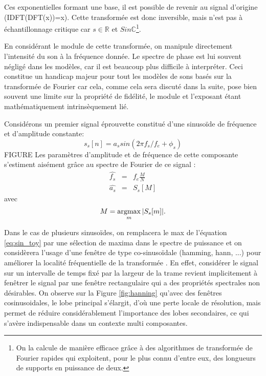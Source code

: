 Ces exponentielles formant une base, il est possible de revenir au signal d'origine (IDFT(DFT(x))=x). Cette transformée est donc inversible, mais n'est pas à échantillonnage critique car $s\in \mathbb{R}$  et $S in \mathbb{C}$\footnote{On la calcule de manière efficace grâce à des algorithmes de transformée de Fourier rapides qui exploitent, pour le plus connu d'entre eux, des longueurs de supports en puissance de deux.}.

En considérant le module de cette transformée, on manipule directement l'intensité du son à la fréquence donnée. Le spectre de phase est lui souvent négligé dans les modèles, car il est beaucoup plus difficile à interpréter. Ceci constitue un handicap majeur pour tout les modèles de sons basés sur la transformée de Fourier car cela, comme cela sera discuté dans la suite, pose bien souvent une limite sur la propriété de fidélité, le module et l'exposant étant mathématiquement intrinsèquement lié.

Considérons un premier signal \og éprouvette \fg constitué d'une sinusoïde de fréquence et d'amplitude constante:
\begin{equation}
  s_s[n] = a_s sin(2\pi f_s/f_e + \phi_s)
  \label{eq:sin_toy}
\end{equation} FIGURE
Les paramètres d'amplitude et de fréquence de cette composante s'estiment aisément grâce au spectre de Fourier de ce signal :
\begin{eqnarray}
  \hat{f_s} &=& f_e \frac{M}{N} \\
  \hat{a_s} &=& S_s[M]
\end{eqnarray}
avec
\begin{equation}
  M = \operatorname*{argmax}_m | S_s[m] |.
\end{equation}

Dans le cas de plusieurs sinusoïdes, on remplacera le max de l'équation \ref{eq:sin_toy} par une sélection de maxima dans le spectre de puissance et on considèrera l'usage d'une fenêtre de type co-sinusoïdale (hamming, hann, ...) pour améliorer la localité fréquentielle de la transformée \cite{harris1978use}. En effet, considérer le signal sur un intervalle de temps fixé par la largeur de la trame revient implicitement à fenêtrer le signal par une fenêtre rectangulaire qui a des propriétés spectrales non désirables. On observe sur la Figure \ref{fig:hanning} qu'avec des fenêtres cosinusoidales, le lobe principal s'élargit, d'où une perte locale de résolution, mais permet de réduire considérablement l'importance des lobes secondaires, ce qui s'avère indispensable dans un contexte multi composantes.

